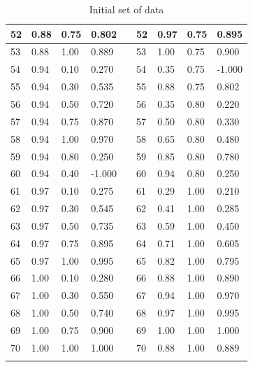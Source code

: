 \documentclass{article}
\begin{document}
\begin{doublespacing}
\begin{appendices}
\begin{longtable}[c]{|l|l|l|l|
>{\columncolor[HTML]{333333}}l |l|l|l|l|}
52             & 0.88    & 0.75  & 0.802  &  & 52           & 0.97    & 0.75  & 0.895  \\ \hline
53             & 0.88    & 1.00  & 0.889  &  & 53           & 1.00    & 0.75  & 0.900  \\ \hline
54             & 0.94    & 0.10  & 0.270  &  & 54           & 0.35    & 0.75  & -1.000 \\ \hline
55             & 0.94    & 0.30  & 0.535  &  & 55           & 0.88    & 0.75  & 0.802  \\ \hline
56             & 0.94    & 0.50  & 0.720  &  & 56           & 0.35    & 0.80  & 0.220  \\ \hline
57             & 0.94    & 0.75  & 0.870  &  & 57           & 0.50    & 0.80  & 0.330  \\ \hline
58             & 0.94    & 1.00  & 0.970  &  & 58           & 0.65    & 0.80  & 0.480  \\ \hline
59             & 0.94    & 0.80  & 0.250  &  & 59           & 0.85    & 0.80  & 0.780  \\ \hline
60             & 0.94    & 0.40  & -1.000 &  & 60           & 0.94    & 0.80  & 0.250  \\ \hline
61             & 0.97    & 0.10  & 0.275  &  & 61           & 0.29    & 1.00  & 0.210  \\ \hline
62             & 0.97    & 0.30  & 0.545  &  & 62           & 0.41    & 1.00  & 0.285  \\ \hline
63             & 0.97    & 0.50  & 0.735  &  & 63           & 0.59    & 1.00  & 0.450  \\ \hline
64             & 0.97    & 0.75  & 0.895  &  & 64           & 0.71    & 1.00  & 0.605  \\ \hline
65             & 0.97    & 1.00  & 0.995  &  & 65           & 0.82    & 1.00  & 0.795  \\ \hline
66             & 1.00    & 0.10  & 0.280  &  & 66           & 0.88    & 1.00  & 0.890  \\ \hline
67             & 1.00    & 0.30  & 0.550  &  & 67           & 0.94    & 1.00  & 0.970  \\ \hline
68             & 1.00    & 0.50  & 0.740  &  & 68           & 0.97    & 1.00  & 0.995  \\ \hline
69             & 1.00    & 0.75  & 0.900  &  & 69           & 1.00    & 1.00  & 1.000  \\ \hline
70             & 1.00    & 1.00  & 1.000  &  & 70           & 0.88    & 1.00  & 0.889  \\ \hline

\caption{Initial set of data}
\label{table:InitialData}
\end{longtable}

\end{appendices}

\newpage %
\end{doublespacing} %
\end{document}
